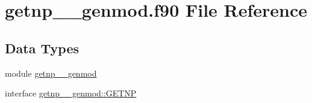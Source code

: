 \hypertarget{getnp____genmod_8f90}{\section{getnp\+\_\+\+\_\+genmod.\+f90 File Reference}
\label{getnp____genmod_8f90}
}
\subsection*{Data Types}
\begin{DoxyCompactItemize}
\item 
module \hyperlink{classgetnp____genmod}{getnp\+\_\+\+\_\+genmod}
\item 
interface \hyperlink{interfacegetnp____genmod_1_1GETNP}{getnp\+\_\+\+\_\+genmod\+::\+G\+E\+T\+N\+P}
\end{DoxyCompactItemize}
